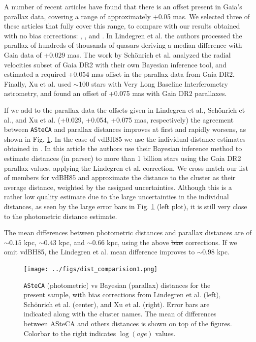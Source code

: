 \documentclass[draft]{aa}
\providecommand{\DIFdeltex}[1]{{\protect\color{red}\sout{#1}}}                      %
\providecommand{\DIFdelbegin}{} %
\providecommand{\DIFdelend}{} %
\providecommand{\DIFdel}[1]{\texorpdfstring{\DIFdeltex{#1}}{}} %
\newcommand{\DIFscaledelfig}{0.5}
\newlength{\DIFdelgraphicswidth} %
\newlength{\DIFdelgraphicsheight} %
\newcommand{\DIFdelincludegraphics}[2][]{%
\sbox{\DIFdelgraphicsbox}{\DIFOincludegraphics[#1]{#2}}%
\settoboxwidth{\DIFdelgraphicswidth}{\DIFdelgraphicsbox} %
\settoboxtotalheight{\DIFdelgraphicsheight}{\DIFdelgraphicsbox} %
\scalebox{\DIFscaledelfig}{%
\parbox[b]{\DIFdelgraphicswidth}{\usebox{\DIFdelgraphicsbox}\\[-\baselineskip] \rule{\DIFdelgraphicswidth}{0em}}\llap{\resizebox{\DIFdelgraphicswidth}{\DIFdelgraphicsheight}{%
\setlength{\unitlength}{\DIFdelgraphicswidth}%
\begin{picture}(1,1)%
\thicklines\linethickness{2pt} %
{\color[rgb]{1,0,0}\put(0,0){\framebox(1,1){}}}%
{\color[rgb]{1,0,0}\put(0,0){\line( 1,1){1}}}%
{\color[rgb]{1,0,0}\put(0,1){\line(1,-1){1}}}%
\end{picture}%
}\hspace*{3pt}}} %
} %
\DeclareRobustCommand{\DIFdelbegin}{\DIFOdelbegin \let\includegraphics\DIFdelincludegraphics} %
\DeclareRobustCommand{\DIFdelend}{\DIFOaddend \let\includegraphics\DIFOincludegraphics} %
\begin{document}
A number of recent articles have found that there is an offset present in
Gaia's parallax data, covering a range of approximately +0.05 mas. We selected
three of these articles that fully cover this range, to compare with our
results obtained with no bias corrections: \cite{Lindegren_2018},
\cite{Schonrich2019}, and \cite{Xu_2019}.
%
In Lindegren et al. the authors processed the parallax of hundreds of
thousands of quasars deriving a median difference with Gaia data of +0.029 mas.
The work by Sch\"onrich et al. analyzed the radial velocities subset of Gaia
DR2 with their own Bayesian inference tool, and estimated a required +0.054 mas
offset in the parallax data from Gaia DR2. Finally, Xu et al. used $\sim$100
stars with Very Long Baseline Interferometry astrometry, and found an offset of
+0.075 mas with Gaia DR2 parallaxes. 

If we add to the parallax data the offsets given in Lindegren et al., 
Sch\"onrich et al., and Xu et al. (+0.029, +0.054, +0.075 mas,
respectively) the agreement between \texttt{ASteCA} and parallax distances
improves at first and rapidly worsens, as shown in Fig. \ref{fig:prlxbias}.
%
In the case of vdBH85 we use the individual distance estimates obtained
in \cite{BailerJones_2018}. In this article the authors use their Bayesian
inference method to estimate distances (in parsec) to more than 1 billion stars
using the Gaia DR2 parallax values, applying the Lindegren et al. correction.
We cross match our list of members for vdBH85 and approximate the distance to
the cluster as their average distance, weighted by the assigned uncertainties.
Although this is a rather low quality estimate due to the large
uncertainties in the individual distances, as seen by the large error bars
in Fig. \ref{fig:prlxbias} (left plot), it is still very close to the
photometric distance estimate.

The mean differences between photometric distances and parallax distances are
of $\sim0.15$ kpc, $\sim0.43$ kpc, and $\sim0.66$ kpc, using the above 
\DIFdelbegin \DIFdel{bias
}\DIFdelend corrections. If we omit vdBH85, the Lindegren et al. mean difference improves
to $\sim0.98$ kpc.\\

\begin{figure}[ht]
    \centering
    \texttt{[image: ../figs/dist\_comparision1.png]}
    \caption{\texttt{ASteCA} (photometric) vs Bayesian (parallax) distances for
    the present sample, with bias corrections from Lindegren et al. (left),
    Sch\"onrich et al. (center), and Xu et al. (right). Error bars are
    indicated along with the cluster names. The mean of differences between
    ASteCA and others distances is shown on top of the figures. Colorbar to
    the right indicates $\log(age)$ values.}
    \label{fig:prlxbias}
\end{figure}
\end{document}
